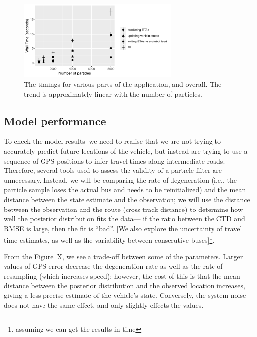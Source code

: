 \begin{figure}[tb]
    \centering
    \includegraphics[width=0.7\textwidth]{figures/04_model_results_timing.pdf}
    \caption{The timings for various parts of the application, and overall. %
        The trend is approximately linear with the number of particles.}
    \label{fig:timings}
\end{figure}




\subsection{Model performance}
\label{sec:model_perf}

To check the model results, 
we need to realise that we are not trying to accurately predict
future locations of the vehicle,
but instead are trying to use a sequence of GPS positions to infer travel
times along intermediate roads.
Therefore, several tools used to assess the validity of a particle filter
are unnecessary.
Instead, we will be comparing the rate of degeneration 
(i.e., the particle sample loses the actual bus and needs to be reinitialized)
and the mean distance between the state estimate and the observation; 
we will use the distance between the observation and the route (cross track distance) 
to determine how well the posterior distribution fits the data---%
if the ratio between the CTD and RMSE is large,
then the fit is ``bad''.
[We also explore the uncertainty of travel time estimates,
as well as the variability between consecutive buses]\footnote{assuming we can get the results in time}.



From the Figure~X, 
we see a trade-off between some of the parameters.
Larger values of GPS error decrease the degeneration rate
as well as the rate of resampling (which increases speed);
however, the cost of this is that the mean distance between the posterior distribution
and the observed location increases, giving a less precise estimate of the vehicle's state.
Conversely, the system noise does not have the same effect,
and only slightly effects the values.


